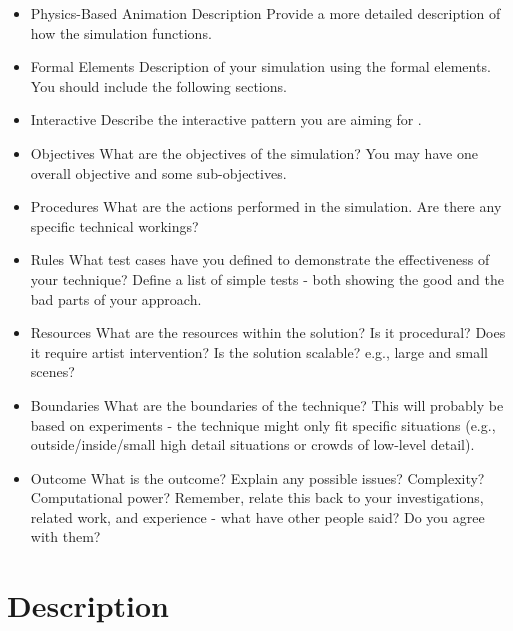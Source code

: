 \documentclass[conference]{acmsiggraph}
\begin{document}
\begin{itemize}
\item{Physics-Based Animation Description}
Provide a more detailed description of how the simulation functions.
\item{Formal Elements}
Description of your simulation using the formal elements.  You should include the following sections.
\item{Interactive}
Describe the interactive pattern you are aiming for .
\item{Objectives}
What are the objectives of the simulation?  You may have one overall objective and some sub-objectives.
\item{Procedures}
What are the actions performed in the simulation.  Are there any specific technical workings?
\item{Rules}
What test cases have you defined to demonstrate the effectiveness of your technique?  Define a list of simple tests - both showing the good and the bad parts of your approach.
\item{Resources}
What are the resources within the solution?  Is it procedural?  Does it require artist intervention?  Is the solution scalable?  e.g., large and small scenes?
\item{Boundaries}
What are the boundaries of the technique?  This will probably be based on experiments - the technique might only fit specific situations (e.g., outside/inside/small high detail situations or crowds of low-level detail).
\item{Outcome}
What is the outcome?  Explain any possible issues?  Complexity? Computational power? Remember, relate this back to your investigations, related work, and experience - what have other people said?  Do you agree with them?
\end{itemize}

\section{Description}
\end{document}
